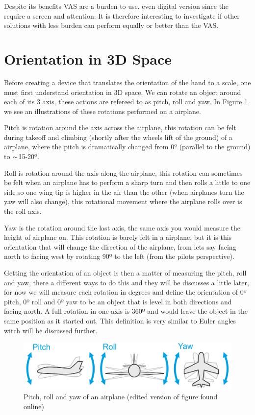 Despite its benefits VAS are a burden to use, even digital version since the require a screen and attention. It is therefore interesting to investigate if other solutions with less burden can perform equally or better than the VAS.



\section{Orientation in 3D Space}
Before creating a device that translates the orientation of the hand to a scale, one must first understand orientation in 3D space. We can rotate an object around each of its 3 axis, these actions are refereed to as pitch, roll and yaw. In Figure \ref{plane} we see an illustrations of these rotations performed on a airplane.

Pitch is rotation around the axis across the airplane, this rotation can be felt during takeoff and climbing (shortly after the wheels lift of the ground) of a airplane, where the pitch is dramatically changed from 0º (parallel to the ground) to $\thicksim$15-20º\cite{takeoff}.

Roll is rotation around the axis along the airplane, this rotation can sometimes be felt when an airplane has to perform a sharp turn and then rolls a little to one side so one wing tip is higher in the air than the other (when airplanes turn the yaw will also change), this rotational movement where the airplane rolls over is the roll axis.

Yaw is the rotation around the last axis, the same axis you would measure the height of airplane on. This rotation is barely felt in a airplane, but it is this orientation that will change the direction of the airplane, from lets say facing north to facing west by rotating 90º to the left (from the pilots perspective).

Getting the orientation of an object is then a matter of measuring the pitch, roll and yaw, there a different ways to do this and they will be discusses a little later, for now we will measure each rotation in degrees and define the orientation of 0º pitch, 0º roll and 0º yaw to be an object that is level in both directions and facing north. A full rotation in one axis is 360º and would leave the object in the same position as it started out. This definition is very similar to Euler angles witch will be discussed further.

\begin{figure}[h!]
    \centering
    \includegraphics[width=1\textwidth]{figures/pitch_rool_yaw_v2.png}
    \caption{Pitch, roll and yaw of an airplane (edited version of figure found online\cite{plane})}
    \label{plane}
\end{figure}


